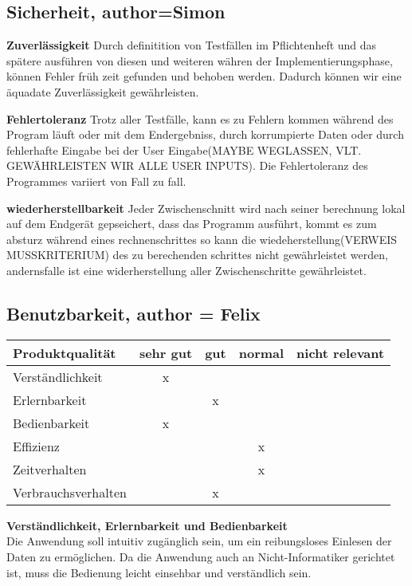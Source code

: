 \documentclass[parskip=full]{scrartcl} %
\begin{document}
\subsection{Sicherheit, author=Simon}

\textbf{Zuverlässigkeit}
Durch definitition von Testfällen im Pflichtenheft und das spätere ausführen von diesen und weiteren währen der Implementierungsphase, können Fehler früh zeit gefunden und behoben werden.
Dadurch können wir eine äquadate Zuverlässigkeit gewährleisten.

\textbf{Fehlertoleranz}
Trotz aller Testfälle, kann es zu Fehlern kommen während des Program läuft oder mit dem Endergebniss, durch korrumpierte Daten oder durch fehlerhafte Eingabe bei der User Eingabe(MAYBE WEGLASSEN, VLT. GEWÄHRLEISTEN WIR ALLE USER INPUTS).
Die Fehlertoleranz des Programmes variiert von Fall zu fall.

\textbf{wiederherstellbarkeit}
Jeder Zwischenschnitt wird nach seiner berechnung lokal auf dem Endgerät gepseichert, dass das Programm ausführt, kommt es zum absturz während eines rechnenschrittes so kann die wiedeherstellung(VERWEIS MUSSKRITERIUM) des zu berechenden schrittes nicht gewährleistet werden, andernsfalle ist  eine widerherstellung aller Zwischenschritte gewährleistet.


\subsection{Benutzbarkeit, author = Felix}
    \begin{tabular}{|l| c| c| c| c|}
    \hline
        Produktqualität & sehr gut & gut & normal & nicht relevant \\
    \hline
        Verständlichkeit & x & & &\\
    \hline
        Erlernbarkeit & & x & &\\
    \hline
        Bedienbarkeit & x & & &\\
    \hline
        Effizienz & & & x &\\
    \hline
        Zeitverhalten & & & x &\\
    \hline
        Verbrauchsverhalten & & x & &\\
    \hline
    \end{tabular}

\textbf{Verständlichkeit, Erlernbarkeit und Bedienbarkeit}\\
Die Anwendung soll intuitiv zugänglich sein, um ein reibungsloses Einlesen der Daten zu ermöglichen. Da die Anwendung auch an Nicht-Informatiker gerichtet ist, muss die Bedienung leicht einsehbar und verständlich sein.
\end{document}
